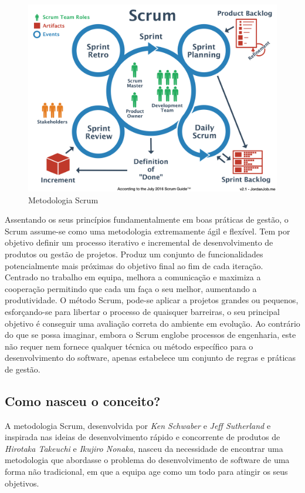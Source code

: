 \begin{figure}[H]
    \centering
    \includegraphics[scale=0.60]{Imagens/scrum.png}
    \caption{Metodologia Scrum}
    \label{fig:scrum}
\end{figure}

Assentando os seus princípios fundamentalmente em boas práticas de gestão, o Scrum assume-se como uma metodologia extremamente ágil e flexível. Tem por objetivo definir um processo iterativo e incremental de desenvolvimento de produtos ou gestão de projetos. Produz um conjunto de funcionalidades potencialmente mais próximas do objetivo final ao fim de cada iteração.
\\
Centrado no trabalho em equipa, melhora a comunicação e maximiza a cooperação permitindo que cada um faça o seu melhor, aumentando a produtividade. O método Scrum, pode-se aplicar a projetos grandes ou pequenos, esforçando-se para libertar o processo de quaisquer barreiras, o seu principal objetivo é conseguir uma avaliação correta do ambiente em evolução. Ao contrário do que se possa imaginar, embora o Scrum englobe processos de engenharia, este não requer nem fornece qualquer técnica ou método específico para o desenvolvimento do software, apenas estabelece um conjunto de regras e práticas de gestão.

\subsection{Como nasceu o conceito?}

A metodologia Scrum, desenvolvida por \textit{Ken Schwaber} e \textit{Jeff Sutherland} e inspirada nas ideias de desenvolvimento rápido e concorrente de produtos de \textit{Hirotaka Takeuchi} e \textit{Ikujiro Nonaka}, nasceu da necessidade de encontrar uma metodologia que abordasse o problema do desenvolvimento de software de uma forma não tradicional, em que a equipa age como um todo para atingir os seus objetivos.

